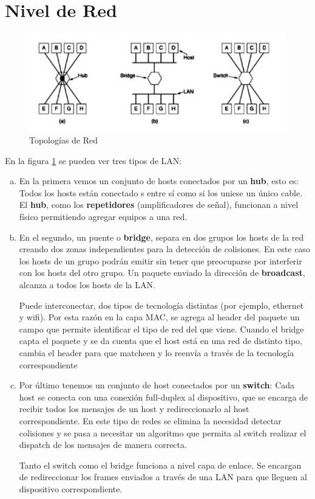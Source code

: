 \part{Nivel de Red}
\begin{figure}[H]
	\centering
	\includegraphics[width=\textwidth
]{images/topologias-red.png}
	\caption[Topologías de Red]{Topologías de Red}
	\label{fig:topologias-red}
\end{figure}
En la figura \ref{fig:topologias-red} se pueden ver tres tipos de LAN:
\begin{enumerate}[a)]
  \item En la primera vemos un conjunto de hosts conectados por un \textbf{hub}, esto es: Todos los hosts están conectado
  s entre sí como si los uniese un único cable. El \textbf{hub}, como los \textbf{repetidores} (amplificadores de señal), funcionan a nivel físico permitiendo agregar equipos a una red.
  \item En el segundo, un puente o \textbf{bridge}, separa en dos grupos los hosts de la red creando dos zonas independientes para la detección de colisiones. En este caso los hosts de un grupo podrán emitir sin tener que preocuparse por interferir con los hosts del otro grupo. Un paquete enviado la dirección de \textbf{broadcast}, alcanza a todos los hosts de la LAN.
  
  Puede interconectar, dos tipos de tecnología distintas (por ejemplo, ethernet y wifi). Por esta razón en la capa MAC, se agrega al header del paquete un campo que permite identificar el tipo de red del que viene. Cuando el bridge capta el paquete y se da cuenta que el host está en una red de distinto tipo, cambia el header para que matcheen y lo reenvía a través de la tecnología correspondiente
  \item Por último tenemos un conjunto de host conectados por un \textbf{switch}: Cada host se conecta con una conexión full-duplex al dispositivo, que se encarga de recibir todos los mensajes de un host y redireccionarlo al host correspondiente. En este tipo de redes se elimina la necesidad detectar colisiones y se pasa a necesitar un algoritmo que permita al switch realizar el dispatch de los mensajes de manera correcta.
  
  Tanto el switch como el bridge funciona a nivel capa de enlace. Se encargan de redireccionar los frames enviados a través de una LAN para que lleguen al dispositivo correspondiente.
\end{enumerate}

